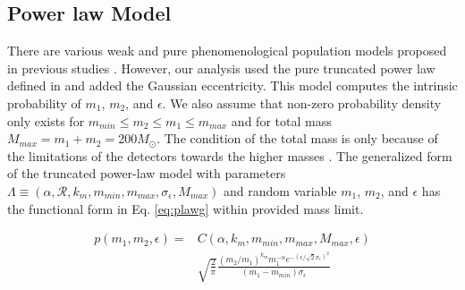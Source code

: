 \documentclass[twocolumn,prd,nofootinbib]{revtex4}
\begin{document}

\subsection{Power law Model}
There are various weak and pure phenomenological population models proposed in previous studies \cite{2016PRXAbbot_BBH_model,2017FishBach_BBH_model,2018talbot_bbh_model}. However, our analysis used the pure truncated power law defined in \cite{2016PRXAbbot_BBH_model,2017FishBach_BBH_model} and added the Gaussian eccentricity. This model computes the intrinsic probability of $m_1$, $m_2$, and $\epsilon$.  
We also assume that non-zero probability density only exists for $m_{min}\leq m_2 \leq m_1 \leq m_{max}$ and for total mass $M_{max}=m_1+m_2 = 200 M_\odot$. The condition of the total mass is only because of the limitations of the detectors towards the higher masses \cite{2016PRXAbbot_BBH_model}. The generalized form of the truncated power-law model with parameters $\Lambda \equiv  (\alpha, \mathcal{R}, k_m, m_{min}, m_{max}, \sigma_\epsilon, M_{max})$ and random variable $m_1$, $m_2$, and $\epsilon$ has the functional form in Eq. \ref{eq:plawg} within provided mass limit.


\begin{align}
\label{eq:plawg}
p(m_1,m_2,\epsilon) = &C(\alpha,k_m,m_{min},m_{max},M_{max},\epsilon)  
\nonumber \\ & \sqrt{\frac{2}{\pi}} \frac{(m_2/m_1)^{k_m} m_1^{-\alpha} e^{-(\epsilon/\sqrt{2}\sigma_\epsilon)^2}}{(m_1-m_{min})\sigma_\epsilon} 
\end{align}
\end{document}
